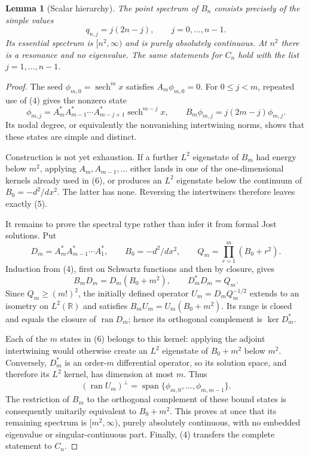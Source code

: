 \documentclass[10pt]{article}
\newtheorem{lemma}{Lemma}
\theoremstyle{remark}
\newcommand{\R}{\mathbb R}
\newcommand{\sech}{\operatorname{sech}}
\begin{document}
\begin{lemma}[Scalar hierarchy]\label{lem:scalar}
The point spectrum of $B_n$ consists precisely of the simple values
\[
 q_{n,j}=j(2n-j),\qquad j=0,\ldots,n-1.                 \tag{5}
\]
Its essential spectrum is $[n^2,\infty)$ and is purely absolutely
continuous.  At $n^2$ there is a resonance and no eigenvalue.  The same
statements for $C_n$ hold with the list $j=1,\ldots,n-1$.
\end{lemma}

\begin{proof}
The seed $\phi_{m,0}=\sech^m x$ satisfies $A_m\phi_{m,0}=0$.
For $0\leq j<m$, repeated use of (4) gives the nonzero state
\[
 \phi_{m,j}=A_m^*A_{m-1}^*\cdots A_{m-j+1}^*
             \sech^{m-j}x,
 \qquad B_m\phi_{m,j}=j(2m-j)\phi_{m,j}.                \tag{6}
\]
Its nodal degree, or equivalently the nonvanishing intertwining norms,
shows that these states are simple and distinct.

Construction is not yet exhaustion.  If a further $L^2$ eigenstate of
$B_m$ had energy below $m^2$, applying $A_m,A_{m-1},\ldots$ either lands
in one of the one-dimensional kernels already used in (6), or produces an
$L^2$ eigenstate below the continuum of $B_0=-d^2/dx^2$.  The latter has
none.  Reversing the intertwiners therefore leaves exactly (5).

It remains to prove the spectral type rather than infer it from formal Jost
solutions.  Put
\[
 D_m=A_m^*A_{m-1}^*\cdots A_1^*,\qquad B_0=-d^2/dx^2,
 \qquad Q_m=\prod_{r=1}^m(B_0+r^2).
\]
Induction from (4), first on Schwartz functions and then by closure, gives
\[
 B_mD_m=D_m(B_0+m^2),\qquad D_m^*D_m=Q_m.               \tag{7}
\]
Since $Q_m\geq(m!)^2$, the initially defined operator
$U_m=D_mQ_m^{-1/2}$ extends to an isometry on $L^2(\R)$ and satisfies
$B_mU_m=U_m(B_0+m^2)$.  Its range is closed and equals the closure of
$\operatorname{ran}D_m$; hence its orthogonal complement is
$\ker D_m^*$.

Each of the $m$ states in (6) belongs to this kernel: applying the adjoint
intertwining would otherwise create an $L^2$ eigenstate of $B_0+m^2$ below
$m^2$.  Conversely, $D_m^*$ is an order-$m$ differential operator, so its
solution space, and therefore its $L^2$ kernel, has dimension at most $m$.
Thus
\[
 (\operatorname{ran}U_m)^\perp
 =\operatorname{span}\{\phi_{m,0},\ldots,\phi_{m,m-1}\}.
\]
The restriction of $B_m$ to the orthogonal complement of these bound
states is consequently unitarily equivalent to $B_0+m^2$.  This proves at
once that its remaining spectrum is $[m^2,\infty)$, purely absolutely
continuous, with no embedded eigenvalue or singular-continuous part.
Finally, (4) transfers the complete statement to $C_n$.
\end{proof}
\end{document}
